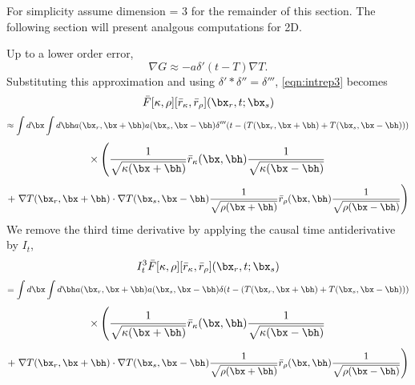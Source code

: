 For simplicity assume dimension = 3 for the remainder of this
section. The following section will present analgous computations for 2D.

Up to a lower order error,
\[
\nabla G \approx -a \delta'(t-T)\nabla T.
\]
Substituting this approximation and using $\delta'*\delta''=\delta'''$, \ref{eqn:intrep3} becomes
\[
\bar{F}[\kappa,\rho][\bar{r}_{\kappa},\bar{r}_{\rho}](\bx_r,t;\bx_s) 
\]
\[
\approx \int d\bx\int d\bh a(\bx_r,\bx+\bh) a(\bx_s,\bx-\bh) 
\delta'''(t-(T(\bx_r,\bx+\bh)+T(\bx_s,\bx-\bh))) 
\]
\[
\times \left(
\frac{1}{\sqrt{\kappa(\bx+\bh)}}  \bar{r}_{\kappa}(\bx,\bh) \frac{1}{\sqrt{\kappa(\bx-\bh)}}
\right.
\]
\begin{equation}
\label{eqn:intrep4}
+\left. 
   \nabla  T(\bx_r,\bx+\bh) \cdot \nabla T(\bx_s,\bx-\bh) 
\frac{1}{\sqrt{\rho(\bx+\bh)}} \bar{r}_{\rho}(\bx,\bh) \frac{1}{\sqrt{\rho(\bx-\bh)}}
\right)
\end{equation}
We remove the third 
time derivative by applying the causal time antiderivative by $I_t$,
\[
I_t^3 \bar{F}[\kappa,\rho][\bar{r}_{\kappa},\bar{r}_{\rho}](\bx_r,t;\bx_s) 
\]
\[
= \int d\bx\int d\bh a(\bx_r,\bx+\bh) a(\bx_s,\bx-\bh) 
\delta(t-(T(\bx_r,\bx+\bh)+T(\bx_s,\bx-\bh)) ) 
\]
\[
\times \left(
\frac{1}{\sqrt{\kappa(\bx+\bh)}}  \bar{r}_{\kappa}(\bx,\bh) \frac{1}{\sqrt{\kappa(\bx-\bh)}}
\right. 
\]
\begin{equation}
\label{eqn:intrep5}
+\left. 
   \nabla  T(\bx_r,\bx+\bh) \cdot \nabla T(\bx_s,\bx-\bh) 
\frac{1}{\sqrt{\rho(\bx+\bh)}} \bar{r}_{\rho}(\bx,\bh) \frac{1}{\sqrt{\rho(\bx-\bh)}}
\right)
\end{equation}

